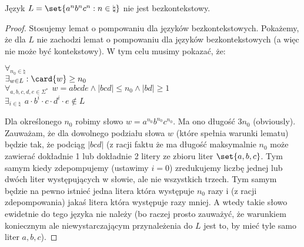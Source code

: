 \begin{theorem}
Język \( L = \set{a^nb^nc^n : n \in \natural} \) nie jest bezkontekstowy.
\end{theorem}

\begin{proof}
Stosujemy lemat o pompowaniu dla języków bezkontekstowych. Pokażemy, że dla \(L\) nie zachodzi lemat o pompowaniu dla języków bezkontekstowych (a więc nie może być kontekstowy). W tym celu musimy pokazać, że:

    \( \forall_{n_0 \in \natural} \) \\
    \( \exists_{w \in L} : \card{w} \geq n_0 \) \\
    \( \forall_{a, b, c, d, e \in \Sigma^*} \hspace{5pt} w = abcde \land |bcd| \leq n_0 \land |bd| \geq 1 \) \\
    \( \exists_{i \in \natural} \hspace{5pt} a \cdot b^{i} \cdot c \cdot d^{i} \cdot e \not\in L\)

Dla określonego \(n_0\) robimy słowo \(w = a^{n_0}b^{n_0}c^{n_0}\). Ma ono długość \(3n_0\) (obviously). Zauważam, że dla dowolnego podziału słowa \(w\) (które spełnia warunki lematu) będzie tak, że podciąg \( |bcd| \) (z racji faktu że ma długość maksymalnie \(n_0\) może zawierać dokładnie 1 lub dokładnie 2 litery ze zbioru liter \( \set{a,b,c} \). Tym samym kiedy zdepompujemy (ustawimy \(i=0\)) zredukujemy liczbę jednej lub dwóch liter występujących w słowie, ale nie wszystkich trzech. Tym samym będzie na pewno istnieć jedna litera która występuje \(n_0\) razy i (z racji zdepompowania) jakaś litera która występuje razy mniej. A wtedy takie słowo ewidetnie do tego języka nie należy (bo raczej prosto zauważyć, że warunkiem koniecznym ale niewystarczającym przynależenia do \(L\) jest to, by mieć tyle samo liter \(a, b, c\)).

\end{proof}